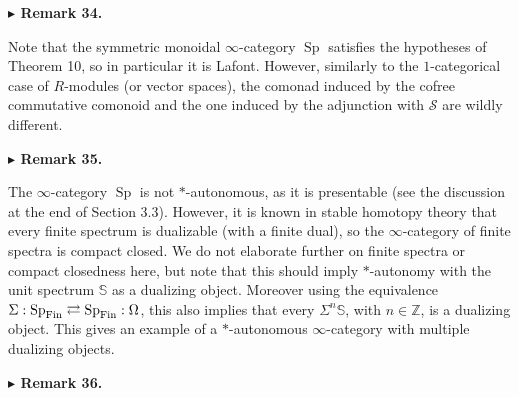 \documentclass[10pt,a4paper]{article}
\begin{document}
 
 
 
\par\medskip\noindent\textbf{$\blacktriangleright$ Remark 34.}\par
 
 
Note that the symmetric monoidal $\infty$-category $\operatorname{Sp}$ satisfies the hypotheses of Theorem 10, so in particular it is Lafont. However, similarly to the $1$-categorical case of $R$-modules (or vector spaces), the comonad induced by the cofree commutative comonoid and the one induced by the adjunction with ${\mathcal{S}}$ are wildly different.\par
 
 
 
 
\par\medskip\noindent\textbf{$\blacktriangleright$ Remark 35.}\par
 
 
The $\infty$-category $\operatorname{Sp}$ is not $\ast$-autonomous, as it is presentable (see the discussion at the end of Section 3.3). However, it is known in stable homotopy theory that every finite spectrum is dualizable (with a finite dual), so the $\infty$-category of finite spectra is compact closed. We do not elaborate further on finite spectra or compact closedness here, but note that this should imply $\ast$-autonomy with the unit spectrum $\mathbb{S}$ as a dualizing object. Moreover using the equivalence $\Sigma:\operatorname{Sp}_{\textnormal{Fin}}\rightleftarrows\operatorname{Sp}_{\textnormal{Fin}}:\Omega$, this also implies that every $\Sigma^{n}\mathbb{S}$, with $n\in\mathbb{Z}$, is a dualizing object. This gives an example of a $\ast$-autonomous $\infty$-category with multiple dualizing objects.\par
 
 
 
 
\par\medskip\noindent\textbf{$\blacktriangleright$ Remark 36.}\par
 
\end{document}
